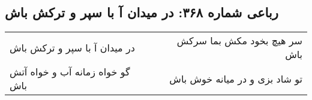 \begin{center}
\section*{رباعی شماره ۳۶۸: در میدان آ با سپر و ترکش باش}
\label{sec:sh368}
\begin{longtable}{l p{0.5cm} r}
در میدان آ با سپر و ترکش باش
&&
سر هیچ بخود مکش بما سرکش باش
\\
گو خواه زمانه آب و خواه آتش باش
&&
تو شاد بزی و در میانه خوش باش
\\
\end{longtable}
\end{center}
